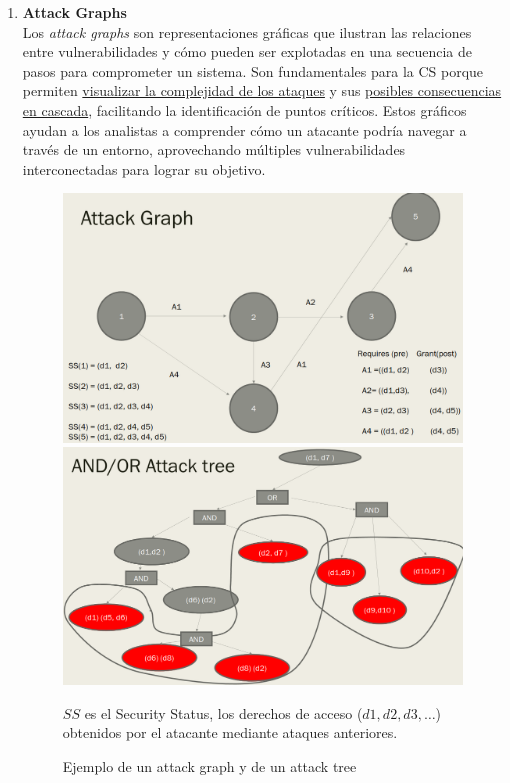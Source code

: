 \begin{enumerate}[resume]


\item \textbf{Attack Graphs}\\
Los \textit{attack graphs} son representaciones gráficas que ilustran las relaciones entre vulnerabilidades y cómo pueden ser explotadas en una secuencia de pasos para comprometer un sistema. Son fundamentales para la CS porque permiten \ul{visualizar la complejidad de los ataques} y sus \ul{posibles consecuencias en cascada}, facilitando la identificación de puntos críticos. Estos gráficos ayudan a los analistas a comprender cómo un atacante podría navegar a través de un entorno, aprovechando múltiples vulnerabilidades interconectadas para lograr su objetivo.

\begin{figure}[htbp]
   \centering
   \includegraphics[width=0.45\columnwidth]{images/00/attackgraph.png}
   \includegraphics[width=0.45\columnwidth]{images/00/attacktree.png}
   \label{fig:00/attackgraph}
   \caption{Ejemplo de un attack graph y de un attack tree}
   $SS$ es el Security Status, los derechos de acceso ($d1,d2,d3,\dots$) obtenidos por el atacante mediante ataques anteriores.
   \nl


\end{figure}
\end{enumerate}
